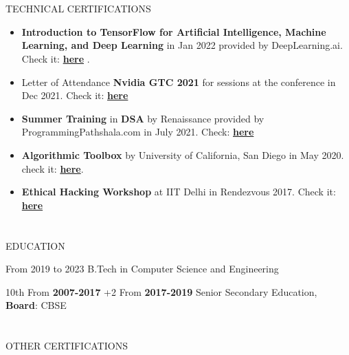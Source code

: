 \documentclass{my_cv}
\begin{document}
\begin{multicols}{2}
\section{\faPaintBrush}{TECHNICAL CERTIFICATIONS}
\begin{itemize}[noitemsep]
    \item \textbf{Introduction to TensorFlow for Artificial Intelligence, Machine Learning, and Deep Learning} in Jan 2022 provided by DeepLearning.ai. Check it: \textbf{\href{https://www.coursera.org/account/accomplishments/certificate/H8WRJYD4T2BQ}{here}} .
    \par
    \item Letter of Attendance\textbf{ Nvidia GTC 2021} for sessions at the conference in Dec 2021.
    Check it: \textbf{\href{https://drive.google.com/file/d/16Tgme1Sr4KLjh2kWmrEXJBxSxgiaxqPo/view}{here}}
    \par
    \item \textbf{Summer Training} in \textbf{DSA} by Renaissance provided by ProgrammingPathshala.com in July 2021. Check: \textbf{\href{https://drive.google.com/file/d/1mEDQhzi45hriBOnNocF9JVuJe5caTsaX/view}{here}}
    \par
    \item \textbf{Algorithmic Toolbox} by University of California, San Diego in May 2020. check it: \textbf{\href{https://www.coursera.org/account/accomplishments/certificate/7TUG86DARH68}{here}}.
    \par
    \item \textbf{Ethical Hacking Workshop} at IIT Delhi in Rendezvous 2017. Check it: \textbf{\href{https://drive.google.com/file/d/1I0uNqQeMgE7rf2xn4YXI0yu-UilRbEui/view}{here}}
\end{itemize}

\section{\faGraduationCap}{EDUCATION}
    
{From 2019 to 2023} %
{B.Tech in Computer Science and Engineering}
    
{ 10th  From \textbf{ 2007-2017 } +2 From \textbf{ 2017-2019 }} 
{Senior Secondary Education, \textbf{Board}: CBSE }

\section{\faStar}{OTHER CERTIFICATIONS}


\end{multicols}
\end{document}
